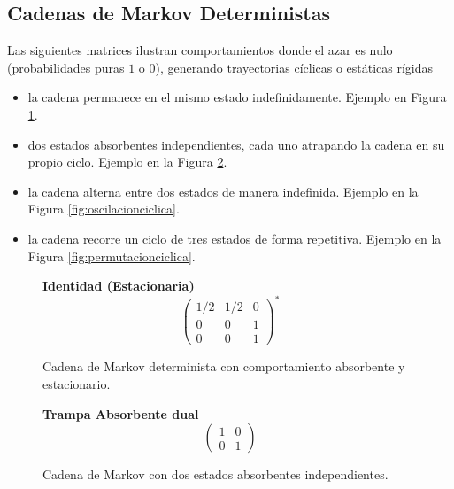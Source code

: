 \subsection{Cadenas de Markov Deterministas}
\noindent
Las siguientes matrices ilustran comportamientos donde el azar es nulo (probabilidades puras $1$ o $0$), generando trayectorias cíclicas o estáticas rígidas
\begin{itemize}
    \item {} la cadena permanece en el mismo estado indefinidamente. Ejemplo en Figura \ref{fig:identidad}.
    \item {} dos estados absorbentes independientes, cada uno atrapando la cadena en su propio ciclo. Ejemplo en la Figura \ref{fig:trampaabsorbente}.
    \item {} la cadena alterna entre dos estados de manera indefinida. Ejemplo en la Figura \ref{fig:oscilacionciclica}.
    \item {} la cadena recorre un ciclo de tres estados de forma repetitiva. Ejemplo en la Figura \ref{fig:permutacionciclica}.
\end{itemize}

\begin{figure}
    \centering
    \textbf{Identidad (Estacionaria)}
    \[ \begin{pmatrix} 1/2 & 1/2 & 0 \\ 0 & 0 & 1 \\ 0 & 0 & 1 \end{pmatrix}^* \]
    \caption{Cadena de Markov determinista con comportamiento absorbente y estacionario.}
    \label{fig:identidad}
\end{figure}

\begin{figure}
    \centering
    \textbf{Trampa Absorbente dual}
    \[ \begin{pmatrix} 1 & 0 \\ 0 & 1 \end{pmatrix} \]
    \caption{Cadena de Markov con dos estados absorbentes independientes.}
    \label{fig:trampaabsorbente}
\end{figure}

